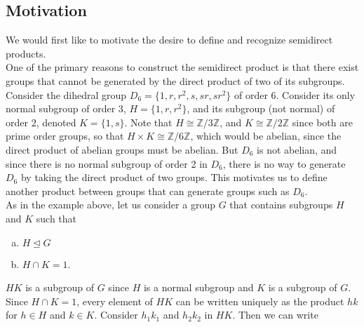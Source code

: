 \documentclass[11pt]{article}
\newcommand{\Z}{\mathbb{Z}}
\newcommand{\ns}{\mathrel{\unlhd}}
\begin{document}
\subsection{Motivation}
We would first like to motivate the desire to define and recognize semidirect products.
\\
\indent
One of the primary reasons to construct the semidirect product is that there exist groups that cannot be generated by the direct product of two of its subgroups. Consider the dihedral group $D_6 = \{1, r, r^2, s, sr, sr^2 \}$ of order 6. Consider its only normal subgroup of order 3, $H = \{ 1, r, r^2\}$, and its subgroup (not normal) of order 2, denoted $K = \{1,s\}$. Note that $H \cong \Z / 3\Z$, and $K \cong \Z / 2\Z$ since both are prime order groups, so that $H \times K \cong \Z / 6 \Z$, which would be abelian, since the direct product of abelian groups must be abelian. But $D_6$ is not abelian, and since there is no normal subgroup of order 2 in $D_6$, there is no way to generate $D_6$ by taking the direct product of two groups. This motivates us to define another product between groups that can generate groups such as $D_6$. 
\\
\indent
As in the example above, let us consider a group $G$ that contains subgroups $H$ and $K$ such that
\begin{enumerate}[(a)]
\item $H \ns G$
\item $H \cap K = 1$.
\end{enumerate}
$HK$ is a subgroup of $G$ since $H$ is a normal subgroup and $K$ is a subgroup of $G$. Since $H\cap K = 1$, every element of $HK$ can be written uniquely as the product $hk$ for $h \in H$ and $k\in K$. Consider $h_1 k_1$ and $h_2 k_2$ in $HK$. Then we can write 
\end{document}
